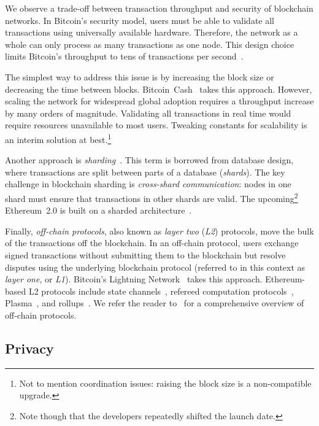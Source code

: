 We observe a trade-off between transaction throughput and security of blockchain networks.
In Bitcoin's security model, users must be able to validate all transactions using universally available hardware.
Therefore, the network as a whole can only process as many transactions as one node.
This design choice limits Bitcoin's throughput to tens of transactions per second~\cite{Croman2016}.

The simplest way to address this issue is by increasing the block size or decreasing the time between blocks.
Bitcoin~Cash~\cite{Kwon2019} takes this approach.
However, scaling the network for widespread global adoption requires a throughput increase by many orders of magnitude.
Validating all transactions in real time would require resources unavailable to most users.
Tweaking constants for scalability is an interim solution at best.\footnote{Not to mention coordination issues: raising the block size is a non-compatible upgrade.}

Another approach is \textit{sharding}~\cite{Gencer2016, Luu2016a}.
This term is borrowed from database design, where transactions are split between parts of a database (\textit{shards}).
The key challenge in blockchain sharding is \textit{cross-shard communication}: nodes in one shard must ensure that transactions in other shards are valid.
The upcoming\footnote{Note though that the developers repeatedly shifted the launch date.} Ethereum~2.0 is built on a sharded architecture~\cite{ShardingFAQ}.

Finally, \textit{off-chain protocols}, also known as \textit{layer two} (\textit{L2}) protocols, move the bulk of the transactions off the blockchain.
In an off-chain protocol, users exchange signed transactions without submitting them to the blockchain but resolve disputes using the underlying blockchain protocol (referred to in this context as \textit{layer one}, or \textit{L1}).
Bitcoin's Lightning Network~\cite{Poon2016} takes this approach.
Ethereum-based L2 protocols include state channels~\cite{Dziembowski2017, RaidenWebsite, Miller2019, }, refereed computation protocols~\cite{Teutsch2017, Kalodner2018}, Plasma~\cite{Poon2017}, and rollups~\cite{Floersch2019, Gluchowski2019}.
We refer the reader to~\cite{Gudgeon2019} for a comprehensive overview of off-chain protocols.


\subsection{Privacy}

